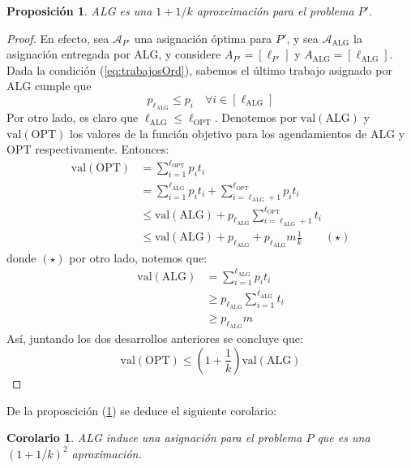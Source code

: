 \documentclass[10pt]{article}
\newcommand{\val}[1]{\text{val}(#1)}
\theoremstyle{plain}
\newtheorem{prop}{Proposición}
\newtheorem{cor}{Corolario}
\theoremstyle{definition}
\begin{document}
\begin{prop}
\label{prop:appP'}
ALG es una $1+1/k$ aproxeimación para el problema $P'$.
\end{prop}
\begin{proof}
En efecto, sea $\mathcal{A}_{P'}$ una asignación óptima para $P'$, y sea $\mathcal{A}_{\text{ALG}}$ la asignación entregada por ALG, y considere $A_{P'} = [\ell_{P'}]$ y $A_{\text{ALG}}= [\ell_{\text{ALG}}]$. Dada la condición (\ref{eq:trabajosOrd}), sabemos el último trabajo asignado por ALG cumple que
\begin{equation}
\label{eq:minorante}
p_{\ell_{\text{ALG}}} \leq p_i \quad \forall i \in [\ell_{\text{ALG}}]
\end{equation}
Por otro lado, es claro que $\ell_{\text{ALG}} \leq \ell_{\text{OPT}}$. Denotemos por $\val{\text{ALG}}$ y $\val{\text{OPT}}$ los valores de la función objetivo para los agendamientos de ALG y OPT respectivamente. Entonces:
\begin{align*}
\val{\text{OPT}} &= \sum_{i = 1}^{\ell_{\text{OPT}}} p_i t_i \\
		  &= \sum_{i=1}^{\ell_\text{ALG}}p_i t_i + \sum_{i = \ell_{\text{ALG}}+1}^{\ell_{\text{OPT}}}p_it_i\\
		  &\leq \val{\text{ALG}}+p_{\ell_\text{ALG}} \sum_{i = \ell_{\text{ALG}}+1}^{\ell_{\text{OPT}}}t_i \\
		  &\leq \val{\text{ALG}}+p_{\ell_\text{ALG}} + p_{\ell_\text{ALG}} m\frac{1}{k} \qquad (\star)
\end{align*}
donde $(\star)$ por otro lado, notemos que:
\begin{align*}
\val{\text{ALG}} &= \sum_{i=1}^{\ell_{\text{ALG}}} p_i t_i \\
		  &\geq p_{\ell_{\text{ALG}}}\sum_{i=1}^{\ell_{\text{ALG}}} t_i\\
		  &\geq p_{\ell_{\text{ALG}}}m
\end{align*}
Así, juntando los dos desarrollos anteriores se concluye que:
$$
\val{\text{OPT}} \leq \left(1 + \frac{1}{k}\right) \val{\text{ALG}}
$$
\end{proof}
De la proposcición (\ref{prop:appP'}) se deduce el siguiente corolario:
\begin{cor}
ALG induce una asignación para el problema $P$ que es una $(1+1/k)^2$ aproximación.
\end{cor}
\end{document}
